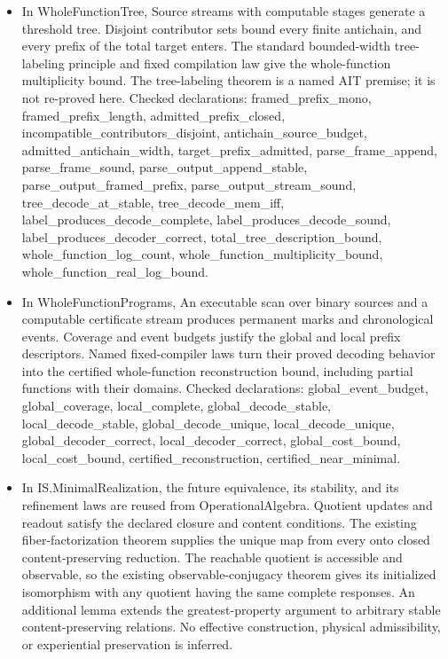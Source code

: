 \documentclass[11pt,a4paper]{article}
\newcommand{\lean}[1]{{\ttfamily\small
  \let\leanunderscore\_\def\_{\leanunderscore\allowbreak}#1}}
\begin{document}
\begin{itemize}[leftmargin=1.4em,itemsep=1pt]
{Checked declarations: \lean{collect\_partrec}, \lean{collect\_correct}, \lean{realized\_task\_computable}, \lean{answers\_length}, \lean{answer\_table\_computable}, \lean{answer\_prefix\_complexity}, \lean{total\_evaluator\_complexity}.\par}
\item {\raggedright In \lean{WholeFunctionTree}, Source streams with computable stages generate a threshold tree. Disjoint contributor sets bound every finite antichain, and every prefix of the total target enters. The standard bounded-width tree-labeling principle and fixed compilation law give the whole-function multiplicity bound. The tree-labeling theorem is a named AIT premise; it is not re-proved here.
Checked declarations: \lean{framed\_prefix\_mono}, \lean{framed\_prefix\_length}, \lean{admitted\_prefix\_closed}, \lean{incompatible\_contributors\_disjoint}, \lean{antichain\_source\_budget}, \lean{admitted\_antichain\_width}, \lean{target\_prefix\_admitted}, \lean{parse\_frame\_append}, \lean{parse\_frame\_sound}, \lean{parse\_output\_append\_stable}, \lean{parse\_output\_framed\_prefix}, \lean{parse\_output\_stream\_sound}, \lean{tree\_decode\_at\_stable}, \lean{tree\_decode\_mem\_iff}, \lean{label\_produces\_decode\_complete}, \lean{label\_produces\_decode\_sound}, \lean{label\_produces\_decoder\_correct}, \lean{total\_tree\_description\_bound}, \lean{whole\_function\_log\_count}, \lean{whole\_function\_multiplicity\_bound}, \lean{whole\_function\_real\_log\_bound}.\par}
\item {\raggedright In \lean{WholeFunctionPrograms}, An executable scan over binary sources and a computable certificate stream produces permanent marks and chronological events. Coverage and event budgets justify the global and local prefix descriptors. Named fixed-compiler laws turn their proved decoding behavior into the certified whole-function reconstruction bound, including partial functions with their domains.
Checked declarations: \lean{global\_event\_budget}, \lean{global\_coverage}, \lean{local\_complete}, \lean{global\_decode\_stable}, \lean{local\_decode\_stable}, \lean{global\_decode\_unique}, \lean{local\_decode\_unique}, \lean{global\_decoder\_correct}, \lean{local\_decoder\_correct}, \lean{global\_cost\_bound}, \lean{local\_cost\_bound}, \lean{certified\_reconstruction}, \lean{certified\_near\_minimal}.\par}
\item {\raggedright In \lean{IS.MinimalRealization}, the future equivalence, its stability, and its refinement laws are reused from \lean{OperationalAlgebra}. Quotient updates and readout satisfy the declared closure and content conditions. The existing fiber-factorization theorem supplies the unique map from every onto closed content-preserving reduction. The reachable quotient is accessible and observable, so the existing observable-conjugacy theorem gives its initialized isomorphism with any quotient having the same complete responses. An additional lemma extends the greatest-property argument to arbitrary stable content-preserving relations. No effective construction, physical admissibility, or experiential preservation is inferred.
}
\end{itemize}
\end{document}
